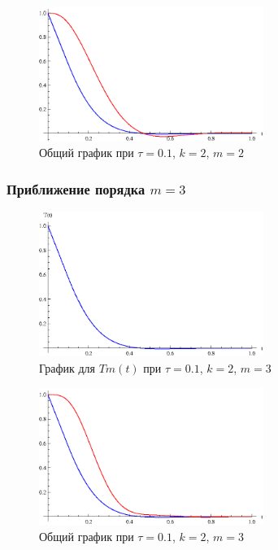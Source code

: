 \begin{figure}[h]
\begin{center}
\includegraphics[width=0.65\textwidth]{./3_results/2_5.eps}
\end{center}
\caption{Общий график при $\tau=0.1$, $k=2$, $m=2$}
\end{figure}

\newpage

\subsubsection{Приближение порядка $m=3$}

\begin{figure}[h]
\begin{center}
\includegraphics[width=0.65\textwidth]{./3_results/2_6.eps}
\end{center}
\caption{График для $Tm(t)$ при $\tau=0.1$, $k=2$, $m=3$}
\end{figure}

\begin{figure}[h]
\begin{center}
\includegraphics[width=0.65\textwidth]{./3_results/2_7.eps}
\end{center}
\caption{Общий график при $\tau=0.1$, $k=2$, $m=3$}
\end{figure}

